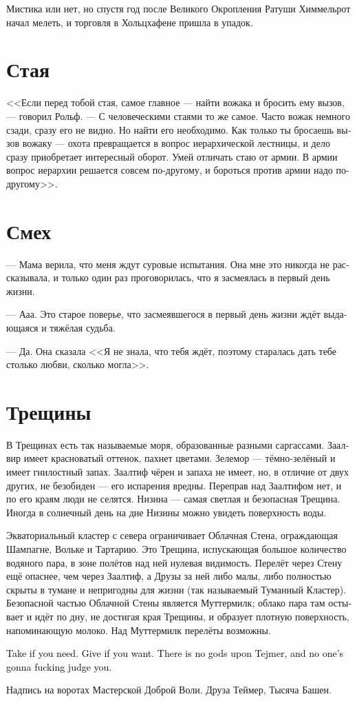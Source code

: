 \documentclass[a4paper,12pt,fleqn]{book}\usepackage{cooltooltips}\usepackage{polyglossia}\setdefaultlanguage[babelshorthands=true]{russian}\setotherlanguage{english}\defaultfontfeatures{Ligatures=TeX,Mapping=tex-text} \usepackage{xcolor}\definecolor{lightgray}{HTML}{bbbbbb}\color{lightgray}\newcommand{\ml}[3]{\textenglish{\textcolor{black}{#3}}}
\begin{document}
Мистика или нет, но спустя год после Великого Окропления Ратуши Химмельрот начал мелеть, и торговля в Хольцхафене пришла в упадок.

\section{Стая}

<<Если перед тобой стая, самое главное --- найти вожака и бросить ему вызов, --- говорил Рольф.
--- С человеческими стаями то же самое.
Часто вожак немного сзади, сразу его не видно.
Но найти его необходимо.
Как только ты бросаешь вызов вожаку --- охота превращается в вопрос иерархической лестницы, и дело сразу приобретает интересный оборот.
Умей отличать стаю от армии.
В армии вопрос иерархии решается совсем по-другому, и бороться против армии надо по-другому>>. 

\section{Смех}

--- Мама верила, что меня ждут суровые испытания.
Она мне это никогда не рассказывала, и только один раз проговорилась, что я засмеялась в первый день жизни.

--- Ааа.
Это старое поверье, что засмеявшегося в первый день жизни ждёт выдающаяся и тяжёлая судьба.

--- Да.
Она сказала <<Я не знала, что тебя ждёт, поэтому старалась дать тебе столько любви, сколько могла>>.

\section{Трещины}

В Трещинах есть так называемые моря, образованные разными саргассами.
Заалвир имеет красноватый оттенок, пахнет цветами.
Зелемор --- тёмно-зелёный и имеет гнилостный запах.
Заалтиф чёрен и запаха не имеет, но, в отличие от двух других, не безобиден --- его испарения вредны.
Переправ над Заалтифом нет, и по его краям люди не селятся.
Низина --- самая светлая и безопасная Трещина.
Иногда в солнечный день на дне Низины можно увидеть поверхность воды.

Экваториальный кластер с севера ограничивает Облачная Стена, ограждающая Шампагне, Вольке и Тартарию.
Это Трещина, испускающая большое количество водяного пара, в зоне полётов над ней нулевая видимость.
Перелёт через Стену ещё опаснее, чем через Заалтиф, а Друзы за ней либо малы, либо полностью скрыты в тумане и непригодны для жизни (так называемый Туманный Кластер).
Безопасной частью Облачной Стены является Муттермилк;
облако пара там остывает и идёт по дну, не достигая края Трещины, и образует плотную поверхность, напоминающую молоко.
Над Муттермилк перелёты возможны.

\epigraph{
\ml{$0$}
{Если нужно --- возьми.}
{Take if you need.}
\ml{$0$}
{Если хочешь --- отдай.}
{Give if you want.}
\ml{$0$}
{Над Теймером нет богов, и никто, чёрт возьми, не будет тебя судить.}
{There is no gods upon Tejmer, and no one's gonna fucking judge you.}
}
{
Надпись на воротах Мастерской Доброй Воли.
Друза Теймер, Тысяча Башен.
}
\end{document}
